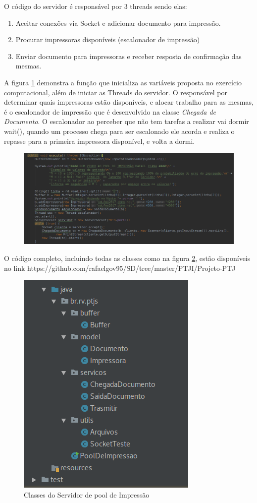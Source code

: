 \documentclass[12pt]{article}
\begin{document}
	  O código do servidor é responsável por 3 threads sendo elas:
	  \begin{enumerate}
	  	\item Aceitar conexões via Socket e adicionar documento para impressão.
	  	\item Procurar impressoras disponíveis (escalonador de impressão)
	  	\item Enviar documento para impressoras e receber resposta de confirmação das mesmas.
	  \end{enumerate}
	
	A figura \ref{fig:screenshot006} demonstra a função que inicializa as variáveis proposta no exercício computacional, além de iniciar as Threads do servidor. 
O responsável por determinar quais impressoras estão disponíveis, e alocar trabalho para as mesmas, é o escalonador de impressão que é desenvolvido na classe \textit{Chegada de Documento}.
O escalonador ao perceber que não tem tarefas a realizar vai dormir wait(), quando um processo chega para ser escalonado ele acorda e realiza o repasse para a primeira impressora disponível, e volta a dormi.


\begin{figure}[H]
	\centering
	\includegraphics[width=1\linewidth]{imagens/screenshot017}
	\caption{}
	\label{fig:screenshot006}
\end{figure}
O código completo, incluindo todas as classes como na figura \ref{fig:screenshot008}, estão disponíveis no link https://github.com/rafaelgov95/SD/tree/master/PTJI/Projeto-PTJ


\begin{figure}[H]
	\centering
	\includegraphics[width=0.4\linewidth]{imagens/screenshot016}
	\caption{Classes do Servidor de pool de Impressão}
	\label{fig:screenshot008}
\end{figure}
\end{document}
